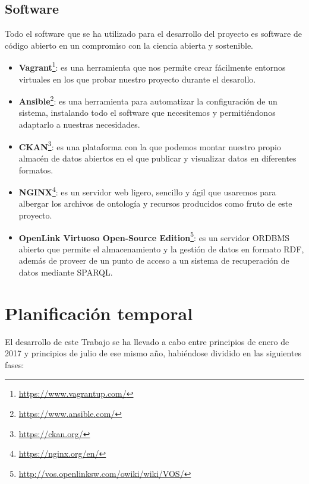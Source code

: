 \subsection{Software}

Todo el software que se ha utilizado para el desarrollo del proyecto es software de código abierto en un compromiso con la ciencia abierta y sostenible.

\begin{itemize}
	\item \textbf{Vagrant}\footnote{\url {https://www.vagrantup.com/}}: es una herramienta que nos permite crear fácilmente entornos virtuales en los que probar nuestro proyecto durante el desarollo. 
	\item \textbf{Ansible}\footnote{\url {https://www.ansible.com/}}: es una herramienta para automatizar la configuración de un sistema, instalando todo el software que necesitemos y permitiéndonos adaptarlo a nuestras necesidades. 
	\item \textbf{CKAN}\footnote{\url {https://ckan.org/}}: es una plataforma con la que podemos montar nuestro propio almacén de datos abiertos en el que publicar y visualizar datos en diferentes formatos.	
	\item \textbf{NGINX}\footnote{\url {https://nginx.org/en/}}: es un servidor web ligero, sencillo y ágil que usaremos para albergar los archivos de ontología y recursos producidos como fruto de este proyecto.
	\item \textbf{OpenLink Virtuoso Open-Source Edition}\footnote{\url {http://vos.openlinksw.com/owiki/wiki/VOS/}}: es un servidor ORDBMS abierto que permite el almacenamiento y la gestión de datos en formato RDF, además de proveer de un punto de acceso a un sistema de recuperación de datos mediante SPARQL.
\end{itemize}

\section{Planificación temporal}

El desarrollo de este {\sf Trabajo} se ha llevado a cabo entre principios de enero de 2017 y principios de julio de ese mismo año, habiéndose dividido en las siguientes fases:

